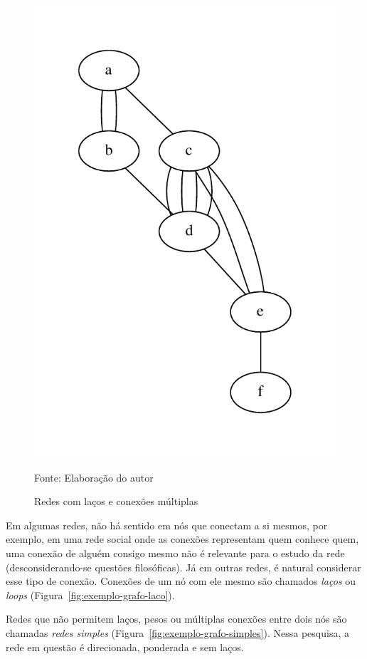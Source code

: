 \documentclass[12pt,a4paper,final]{article}
\newcommand{\source}[1]{\vspace{-10pt} \caption*{Fonte: {#1}} }
\begin{document}
\begin{figure}[ht]
{        \includegraphics[scale=0.5]{multiple.pdf}
        \label{fig:exemplo-grafo-multiplo}
    }    
    \caption{Redes com laços e conexões múltiplas}
    \source{Elaboração do autor}
\end{figure}

Em algumas redes, não há sentido em nós que conectam a si mesmos, por exemplo, em uma rede social onde as conexões representam quem conhece quem, uma conexão de alguém consigo mesmo não é relevante para o estudo da rede (desconsiderando-se questões filosóficas). Já em outras redes, é natural considerar esse tipo de conexão. Conexões de um nó com ele mesmo são chamados \textit{laços} ou \textit{loops} (Figura~\ref{fig:exemplo-grafo-laco}).

Redes que não permitem laços, pesos ou múltiplas conexões entre dois nós são chamadas \textit{redes simples} (Figura~\ref{fig:exemplo-grafo-simples}). Nessa pesquisa, a rede em questão é direcionada, ponderada e sem laços.
\end{document}
